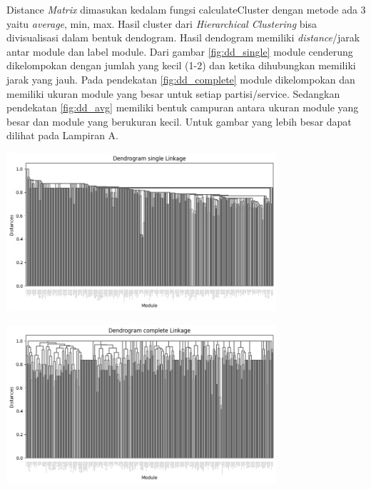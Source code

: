 Distance \textit{Matrix} dimasukan kedalam fungsi calculateCluster dengan metode ada 3 yaitu \textit{average}, min, max. Hasil cluster dari \textit{Hierarchical Clustering} bisa divisualisasi dalam bentuk dendogram. Hasil dendogram memiliki \textit{distance}/jarak antar module dan label module. Dari gambar \ref{fig:dd_single} module cenderung dikelompokan dengan jumlah yang kecil (1-2) dan ketika dihubungkan memiliki jarak yang jauh. Pada pendekatan \ref{fig:dd_complete} module dikelompokan dan memiliki ukuran module yang besar untuk setiap partisi/service. Sedangkan pendekatan \ref{fig:dd_avg} memiliki bentuk campuran antara ukuran module yang besar dan module yang berukuran kecil. Untuk gambar yang lebih besar dapat dilihat pada Lampiran A.


\begin{center}
	\includegraphics[width=10cm]{img/bab_4/single_dd.png}
	\label{fig:dd_single}
\end{center}

\begin{center}
	\includegraphics[width=10cm]{img/bab_4/complete_dd.png}
	\label{fig:dd_complete}
\end{center}

